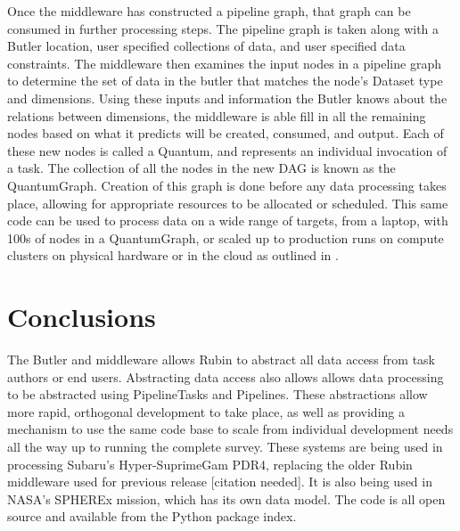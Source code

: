 Once the middleware has constructed a pipeline graph, that graph can be consumed in further processing steps. The pipeline graph is taken along with a Butler location, user specified collections of data, and user specified data constraints.  The middleware then examines the input nodes in a pipeline graph to determine the set of data in the butler that matches the node's Dataset type and dimensions. Using these inputs and information the Butler knows about the relations between dimensions, the middleware is able fill in all the remaining nodes based on what it predicts will be created, consumed, and output. Each of these new nodes is called a Quantum, and represents an individual invocation of a task. The collection of all the nodes in the new DAG is known as the QuantumGraph. Creation of this graph is done before any data processing takes place, allowing for appropriate resources to be allocated or scheduled. This same code can be used to process data on a wide range of targets, from a laptop, with 100s of nodes in a QuantumGraph, or scaled up to production runs on compute clusters on physical hardware or in the cloud as outlined in \citet{P52_adassxxxii}.

\section{Conclusions}
The Butler and middleware allows Rubin to abstract all data access from task authors or end users. Abstracting data access also allows allows data processing to be abstracted using PipelineTasks and Pipelines. These abstractions allow more rapid, orthogonal development to take place, as well as providing a mechanism to use the same code base to scale from individual development needs all the way up to running the complete survey. These systems are being used in processing Subaru's Hyper-SuprimeGam PDR4, replacing the older Rubin middleware used for previous release [citation needed]. It is also being used in NASA's SPHEREx mission, which has its own data model. The code is all open source and available from the Python package index.

\vskip 0.4in